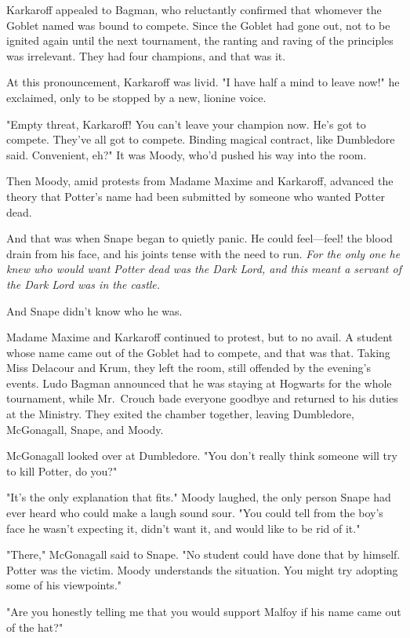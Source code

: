 Karkaroff appealed to Bagman, who reluctantly confirmed that whomever the Goblet named was bound to compete. Since the Goblet had gone out, not to be ignited again until the next tournament, the ranting and raving of the principles was irrelevant. They had four champions, and that was it.

At this pronouncement, Karkaroff was livid. "I have half a mind to leave now!" he exclaimed, only to be stopped by a new, lionine voice.

"Empty threat, Karkaroff! You can't leave your champion now. He's got to compete. They've all got to compete. Binding magical contract, like Dumbledore said. Convenient, eh?" It was Moody, who'd pushed his way into the room.

Then Moody, amid protests from Madame Maxime and Karkaroff, advanced the theory that Potter's name had been submitted by someone who wanted Potter dead.

And that was when Snape began to quietly panic. He could feel—feel! the blood drain from his face, and his joints tense with the need to run. \emph{For the only one he knew who would want Potter dead was the Dark Lord, and this meant a servant of the Dark Lord was in the castle.}

And Snape didn't know who he was.

Madame Maxime and Karkaroff continued to protest, but to no avail. A student whose name came out of the Goblet had to compete, and that was that. Taking Miss Delacour and Krum, they left the room, still offended by the evening's events. Ludo Bagman announced that he was staying at Hogwarts for the whole tournament, while Mr.~Crouch bade everyone goodbye and returned to his duties at the Ministry. They exited the chamber together, leaving Dumbledore, McGonagall, Snape, and Moody.

McGonagall looked over at Dumbledore. "You don't really think someone will try to kill Potter, do you?"

"It's the only explanation that fits." Moody laughed, the only person Snape had ever heard who could make a laugh sound sour. "You could tell from the boy's face he wasn't expecting it, didn't want it, and would like to be rid of it."

"There," McGonagall said to Snape. "No student could have done that by himself. Potter was the victim. Moody understands the situation. You might try adopting some of his viewpoints."

"Are you honestly telling me that you would support Malfoy if his name came out of the hat?"

